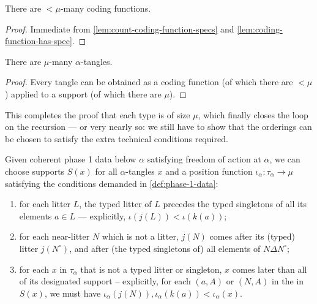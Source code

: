 \begin{corollary}
  \label{cor:count-coding-functions}
  There are $<\mu$-many coding functions.
\end{corollary}

\begin{proof}
  Immediate from \cref{lem:count-coding-function-specs} and \cref{lem:coding-function-has-spec}.
\end{proof}

\begin{corollary}
  \label{cor:count-tangles}
  There are $\mu$-many $\alpha$-tangles.
\end{corollary}

\begin{proof}
  Every tangle can be obtained as a coding function (of which there are $<\mu$) applied to a support (of which there are $\mu$).
\end{proof}

This completes the proof that each type is of size $\mu$, which finally closes the loop on the recursion --- or very nearly so: we still have to show that the orderings can be chosen to satisfy the extra technical conditions required.

\begin{lemma}
  \label{lem:position-functions-propagate}
  Given coherent phase 1 data below $\alpha$ satisfying freedom of action at $\alpha$, we can choose supports $S(x)$ for all $\alpha$-tangles $x$ and a position function $\iota_\alpha : \tau_\alpha \to \mu$ satisfying the conditions demanded in \cref{def:phase-1-data}:
  \begin{enumerate}
    \item for each litter $L$, the typed litter of $L$ precedes the typed singletons of all its elements $a \in L$ --- explicitly, $\iota(j(L)) < \iota(k(a))$;
    \item for each near-litter $N$ which is not a litter, $j(N)$ comes after its (typed) litter $j(N^\circ)$, and after (the typed singletons of) all elements of $N \Delta N^\circ$;

    \item for each $x$ in $\tau_\alpha$ that is not a typed litter or singleton, $x$ comes later than all of its designated support -- explicitly, for each $(a,A)$ or $(N,A)$ in the in $S(x)$, we must have $\iota_\alpha(j(N)), \iota_\alpha(k(a))<\iota_\alpha(x)$.
  \end{enumerate}
\end{lemma}


